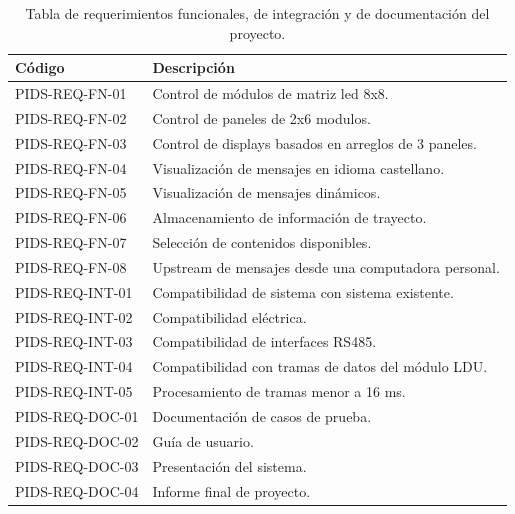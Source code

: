 \begin{table}[htb]
\caption{Tabla de requerimientos funcionales, de integración y de documentación del proyecto.}
\label{tab:Reqs}
\begin{center}
\begin{tabular}{|l|l|}
\hline
\textbf{Código} & \textbf{Descripción}                                 \\ \hline
PIDS-REQ-FN-01  & Control de módulos de matriz led 8x8.                 \\ \hline
PIDS-REQ-FN-02  & Control de paneles de 2x6 modulos.                    \\ \hline
PIDS-REQ-FN-03  & Control de displays basados en arreglos de 3 paneles. \\ \hline
PIDS-REQ-FN-04  & Visualización de mensajes en idioma castellano.       \\ \hline
PIDS-REQ-FN-05  & Visualización de mensajes dinámicos.                  \\ \hline
PIDS-REQ-FN-06  & Almacenamiento de información de trayecto.            \\ \hline
PIDS-REQ-FN-07  & Selección de contenidos disponibles.                  \\ \hline
PIDS-REQ-FN-08  & Upstream de mensajes desde una computadora personal.  \\ \hline
PIDS-REQ-INT-01 & Compatibilidad de sistema con sistema existente.      \\ \hline
PIDS-REQ-INT-02 & Compatibilidad eléctrica.                             \\ \hline
PIDS-REQ-INT-03 & Compatibilidad de interfaces RS485.                   \\ \hline
PIDS-REQ-INT-04 & Compatibilidad con tramas de datos del módulo LDU.    \\ \hline
PIDS-REQ-INT-05 & Procesamiento de tramas menor a 16 ms.                \\ \hline
PIDS-REQ-DOC-01 & Documentación de casos de prueba.                     \\ \hline
PIDS-REQ-DOC-02 & Guía de usuario.                                      \\ \hline
PIDS-REQ-DOC-03 & Presentación del sistema.                             \\ \hline
PIDS-REQ-DOC-04 & Informe final de proyecto.                            \\ \hline
\end{tabular}
\end{center}
\end{table}



